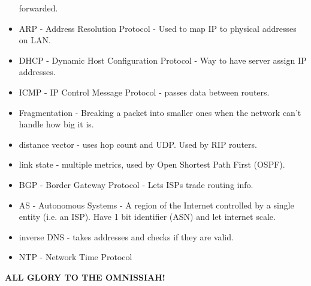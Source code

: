 \documentclass{scrartcl}
\begin{document}
\begin{itemize}
forwarded.
\item ARP - Address Resolution Protocol - Used to map IP to physical addresses
on LAN.
\item DHCP - Dynamic Host Configuration Protocol - Way to have server assign IP
addresses.
\item ICMP - IP Control Message Protocol - passes data between routers.
\item Fragmentation - Breaking a packet into smaller ones when the network can't
handle how big it is.
\item distance vector - uses hop count and UDP. Used by RIP routers.
\item link state - multiple metrics, used by Open Shortest Path First (OSPF).
\item BGP - Border Gateway Protocol - Lets ISPs trade routing info.
\item AS - Autonomous Systems - A region of the Internet controlled by a single
entity (i.e. an ISP). Have 1 bit identifier (ASN) and let internet scale.
\item inverse DNS - takes addresses and checks if they are valid.
\item NTP - Network Time Protocol
\end{itemize}
\textbf{ALL GLORY TO THE OMNISSIAH!}
\end{document}
